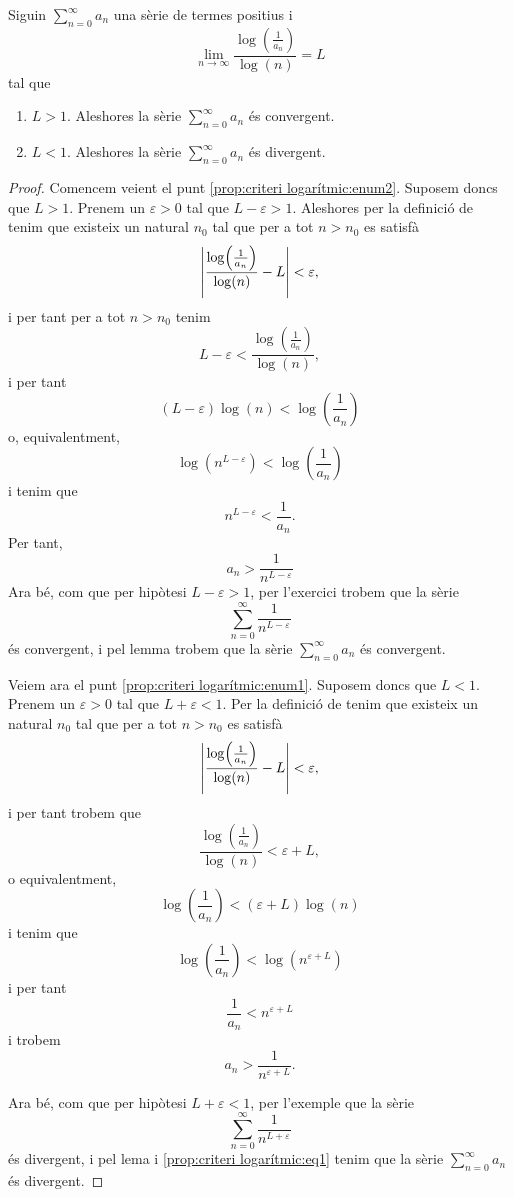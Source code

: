 \documentclass[../Apunts.tex]{subfiles}
\begin{document}
	\begin{proposition}
		\label{prop:criteri logarítmic}
		Siguin \(\sum_{n=0}^{\infty}a_{n}\) una sèrie de termes positius i
		\[\lim_{n\to\infty}\frac{\log\left(\frac{1}{a_{n}}\right)}{\log(n)}=L\]
		tal que
		\begin{enumerate}
			\item\label{prop:criteri logarítmic:enum1} \(L>1\). Aleshores la sèrie \(\sum_{n=0}^{\infty}a_{n}\) és convergent.
			\item\label{prop:criteri logarítmic:enum2} \(L<1\). Aleshores la sèrie \(\sum_{n=0}^{\infty}a_{n}\) és divergent.
		\end{enumerate}
		\begin{proof}
			Comencem veient el punt \eqref{prop:criteri logarítmic:enum2}. Suposem doncs que \(L>1\). Prenem un \(\varepsilon>0\) tal que \(L-\varepsilon>1\). Aleshores per la definició de  tenim que existeix un natural \(n_{0}\) tal que per a tot \(n>n_{0}\) es satisfà
			\[\abs{\frac{\log\left(\frac{1}{a_{n}}\right)}{\log(n)}-L}<\varepsilon,\]
			i per tant per a tot \(n>n_{0}\) tenim
			\[L-\varepsilon<\frac{\log\left(\frac{1}{a_{n}}\right)}{\log(n)},\]
			i per tant
			\[(L-\varepsilon)\log(n)<\log\left(\frac{1}{a_{n}}\right)\]
			o, equivalentment,
			\[\log\left(n^{L-\varepsilon}\right)<\log\left(\frac{1}{a_{n}}\right)\]
			i tenim que %
			\[n^{L-\varepsilon}<\frac{1}{a_{n}}.\]
			Per tant,
			\[a_{n}>\frac{1}{n^{L-\varepsilon}}\]
			Ara bé, com que per hipòtesi \(L-\varepsilon>1\), per l'exercici  trobem que la sèrie
			\[\sum_{n=0}^{\infty}\frac{1}{n^{L-\varepsilon}}\]
			és convergent, i pel lemma  trobem que la sèrie \(\sum_{n=0}^{\infty}a_{n}\) és convergent.
			
			Veiem ara el punt \eqref{prop:criteri logarítmic:enum1}. Suposem doncs que \(L<1\). Prenem un \(\varepsilon>0\) tal que \(L+\varepsilon<1\). Per la definició de  tenim que existeix un natural \(n_{0}\) tal que per a tot \(n>n_{0}\) es satisfà
			\[\abs{\frac{\log\left(\frac{1}{a_{n}}\right)}{\log(n)}-L}<\varepsilon,\]
			i per tant trobem que
			\[\frac{\log\left(\frac{1}{a_{n}}\right)}{\log(n)}<\varepsilon+L,\]
			o equivalentment,
			\[\log\left(\frac{1}{a_{n}}\right)<(\varepsilon+L)\log(n)\]
			i tenim que
			\[\log\left(\frac{1}{a_{n}}\right)<\log\left(n^{\varepsilon+L}\right)\]
			i per tant
			\[\frac{1}{a_{n}}<n^{\varepsilon+L}\]
			i trobem
			\begin{equation}
				\label{prop:criteri logarítmic:eq1}
				a_{n}>\frac{1}{n^{\varepsilon+L}}.
			\end{equation}
			
			Ara bé, com que per hipòtesi \(L+\varepsilon<1\), per l'exemple  que la sèrie
			\[\sum_{n=0}^{\infty}\frac{1}{n^{L+\varepsilon}}\]
			és divergent, i pel lema  i \eqref{prop:criteri logarítmic:eq1} tenim que la sèrie \(\sum_{n=0}^{\infty}a_{n}\) és divergent.
		\end{proof}
	\end{proposition}
\end{document}
